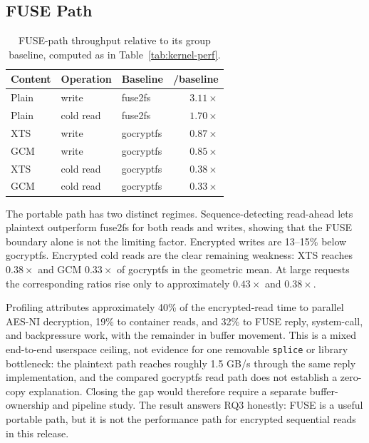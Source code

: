 \subsection{FUSE Path}
\label{subsec:eval-fuse}

\begin{table}[t]
  \centering
  \caption{FUSE-path throughput relative to its group baseline, computed as in
  Table~\ref{tab:kernel-perf}.}
  \label{tab:fuse-perf}
  \begin{tabular}{lllr}
    \toprule
    Content & Operation & Baseline & \sfs{}/baseline \\
    \midrule
    Plain & write & fuse2fs & \(3.11\times\) \\
    Plain & cold read & fuse2fs & \(1.70\times\) \\
    XTS & write & gocryptfs & \(0.87\times\) \\
    GCM & write & gocryptfs & \(0.85\times\) \\
    XTS & cold read & gocryptfs & \(0.38\times\) \\
    GCM & cold read & gocryptfs & \(0.33\times\) \\
    \bottomrule
  \end{tabular}
\end{table}

The portable path has two distinct regimes.  Sequence-detecting read-ahead
lets plaintext \sfs{} outperform fuse2fs for both reads and writes, showing
that the FUSE boundary alone is not the limiting factor.  Encrypted writes are
13--15\% below gocryptfs.  Encrypted cold reads are the clear remaining
weakness: XTS reaches \(0.38\times\) and GCM \(0.33\times\) of gocryptfs in the
geometric mean.  At large requests the corresponding ratios rise only to
approximately \(0.43\times\) and \(0.38\times\).

Profiling attributes approximately 40\% of the encrypted-read time to
parallel AES-NI decryption, 19\% to container reads, and 32\% to FUSE reply,
system-call, and backpressure work, with the remainder in buffer movement.
This is a mixed end-to-end userspace ceiling, not evidence for one removable
\texttt{splice} or library bottleneck: the plaintext path reaches roughly
1.5 GB/s through the same reply implementation, and the compared gocryptfs
read path does not establish a zero-copy explanation.  Closing the gap would
therefore require a separate buffer-ownership and pipeline study.  The result
answers RQ3 honestly: FUSE is a useful portable path, but it is not the
performance path for encrypted sequential reads in this release.

